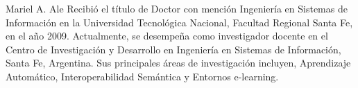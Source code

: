 \documentclass[journal]{IEEEtran}
\begin{document}

\vfill

\newpage

\begin{IEEEbiography}{Mariel A. Ale}
Recibió el título de Doctor con mención Ingeniería en Sistemas de Información en la Universidad Tecnológica Nacional, Facultad Regional Santa Fe, en el año 2009. Actualmente, se desempeña como investigador docente en el Centro de Investigación y Desarrollo en Ingeniería en Sistemas de Información, Santa Fe, Argentina. Sus principales áreas de investigación incluyen, Aprendizaje Automático, Interoperabilidad Semántica y Entornos e-learning.
\end{IEEEbiography}






\end{document}
